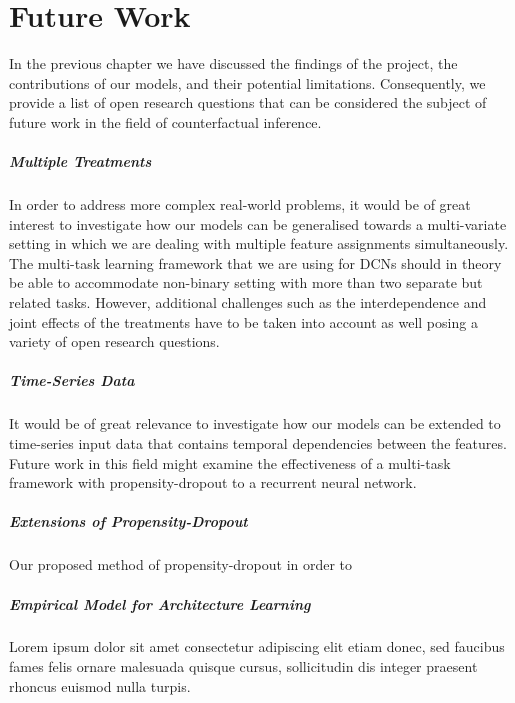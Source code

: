 %

\chapter{\label{ch:8-future-work}Future Work} 
In the previous chapter we have discussed the findings of the project, the contributions of our models, and their potential limitations. Consequently, we provide a list of open research questions that can be considered the subject of future work in the field of counterfactual inference. 

\paragraph{Multiple Treatments} In order to address more complex real-world problems, it would be of great interest to investigate how our models can be generalised towards a multi-variate setting in which we are dealing with multiple feature assignments simultaneously. The multi-task learning framework that we are using for DCNs should in theory be able to accommodate non-binary setting with more than two separate but related tasks. However, additional challenges such as the interdependence and joint effects of the treatments have to be taken into account as well posing a variety of open research questions. 

\paragraph{Time-Series Data} It would be of great relevance to investigate how our models can be extended to time-series input data that contains temporal dependencies between the features. Future work in this field might examine the effectiveness of a multi-task framework with propensity-dropout to a recurrent neural network. 

\paragraph{Extensions of Propensity-Dropout} Our proposed method of propensity-dropout in order to 

\paragraph{Empirical Model for Architecture Learning} Lorem ipsum dolor sit amet consectetur adipiscing elit etiam donec, sed faucibus fames felis ornare malesuada quisque cursus, sollicitudin dis integer praesent rhoncus euismod nulla turpis.


%



